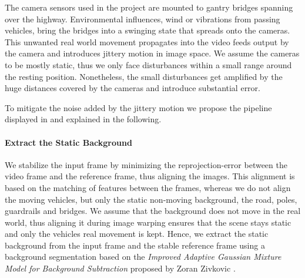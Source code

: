 The camera sensors used in the project are mounted to gantry bridges spanning over the highway.
Environmental influences, \eg{} wind or vibrations from passing vehicles, bring the bridges into a swinging state that spreads onto the cameras. 
This unwanted real world movement propagates into the video feeds output by the camera and introduces jittery motion in image space. 
We assume the cameras to be mostly static, thus we only face disturbances within a small range around the resting position.
Nonetheless, the small disturbances get amplified by the huge distances covered by the cameras and introduce substantial error.

To mitigate the noise added by the jittery motion we propose the pipeline displayed in  and explained in the following.


\paragraph{Extract the Static Background}
We stabilize the input frame by minimizing the reprojection-error between the video frame and the reference frame, thus aligning the images.
This alignment is based on the matching of features between the frames, whereas we do not align the moving vehicles, but only the static non-moving background, \eg{} the road, poles, guardrails and bridges.
We assume that the background does not move in the real world, thus aligning it during image warping ensures that the scene stays static and only the vehicles real movement is kept.
Hence, we extract the static background from the input frame and the stable reference frame using a background segmentation based on
the \emph{Improved Adaptive Gaussian Mixture Model for Background Subtraction} proposed by Zoran Zivkovic \etal{} \cite{zivkovic10.5555/1018428.1020644,zivkovic10.1016/j.patrec.2005.11.005,opencv_library}.


